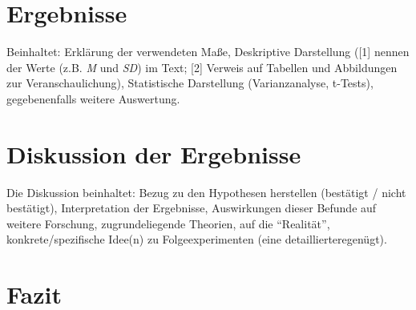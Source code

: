 \documentclass[11pt,a4paper,ngerman]{article}
\begin{document}
\section{Ergebnisse}
Beinhaltet: Erklärung der verwendeten Maße, Deskriptive Darstellung ([1] nennen der Werte (z.B. \textit{M} und \textit{SD}) im Text; [2] Verweis auf Tabellen und Abbildungen zur Veranschaulichung), Statistische Darstellung (Varianzanalyse, t-Tests), gegebenenfalls weitere Auswertung.





\section{Diskussion der Ergebnisse}
Die Diskussion beinhaltet: Bezug zu den Hypothesen herstellen (bestätigt / nicht bestätigt), Interpretation der Ergebnisse, Auswirkungen dieser Befunde auf weitere Forschung, zugrundeliegende Theorien, auf die "`Realität"', konkrete/spezifische Idee(n) zu Folgeexperimenten (eine detailliertere\linebreak genügt).

\section{Fazit}

\end{document}
